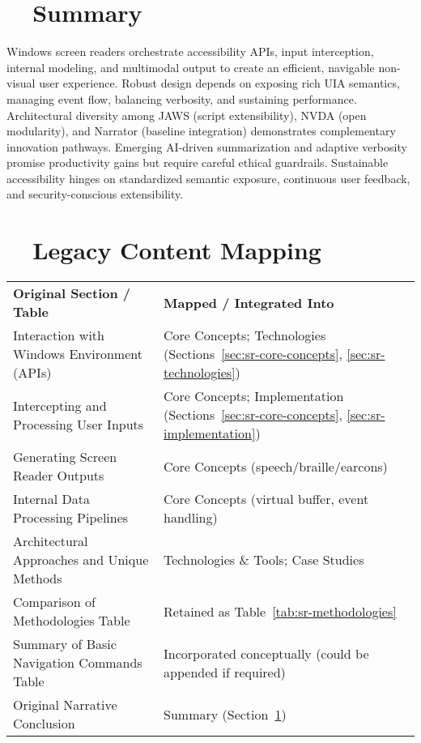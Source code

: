 \section{~~Summary}
\label{sec:sr-summary}
Windows screen readers orchestrate accessibility APIs, input interception, internal modeling, and multimodal output to create an efficient, navigable non-visual user experience. Robust design depends on exposing rich UIA semantics, managing event flow, balancing verbosity, and sustaining performance. Architectural diversity among JAWS (script extensibility), NVDA (open modularity), and Narrator (baseline integration) demonstrates complementary innovation pathways. Emerging AI-driven summarization and adaptive verbosity promise productivity gains but require careful ethical guardrails. Sustainable accessibility hinges on standardized semantic exposure, continuous user feedback, and security-conscious extensibility.

\section{~~Legacy Content Mapping}
\label{sec:sr-legacy-mapping}
\begin{tabular}{p{} p{}}
	\textbf{Original Section / Table}           & \textbf{Mapped / Integrated Into}                                                                \\
	Interaction with Windows Environment (APIs) & Core Concepts; Technologies (Sections~\ref{sec:sr-core-concepts}, \ref{sec:sr-technologies})     \\
	Intercepting and Processing User Inputs     & Core Concepts; Implementation (Sections~\ref{sec:sr-core-concepts}, \ref{sec:sr-implementation}) \\
	Generating Screen Reader Outputs            & Core Concepts (speech/braille/earcons)                                                           \\
	Internal Data Processing Pipelines          & Core Concepts (virtual buffer, event handling)                                                   \\
	Architectural Approaches and Unique Methods & Technologies \& Tools; Case Studies                                                              \\
	Comparison of Methodologies Table           & Retained as Table~\ref{tab:sr-methodologies}                                                     \\
	Summary of Basic Navigation Commands Table  & Incorporated conceptually (could be appended if required)                                        \\
	Original Narrative Conclusion               & Summary (Section~\ref{sec:sr-summary})                                                           \\
\end{tabular}

